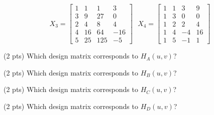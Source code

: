 \documentclass[twoside,12pt]{article}
\begin{document}
\begin{probset}
\begin{prob}
$$$$ 
$$
    X_3 = \begin{bmatrix}
    1 & 1 & 1 & 3 \\
    3 & 9 & 27 & 0 \\
    2 & 4 & 8 & 4 \\
    4 & 16 & 64 & -16 \\
    5 & 25 & 125 & -5
    \end{bmatrix} \ \ \ 
    X_4 = \begin{bmatrix}
    1 & 1 & 3  & 9 \\
    1 & 3 & 0  & 0 \\
    1 & 2 & 2  & 4 \\
    1 & 4 & -4 & 16 \\
    1 & 5 & -1 & 1
    \end{bmatrix}
$$
    

\begin{subprobset}
    \begin{subprob}(2 pts)
        Which design matrix corresponds to $H_A(u, v)$?

        \begin{center}
        \end{center}
    \end{subprob}

    \begin{subprob}(2 pts)
        Which design matrix corresponds to $H_B(u, v)$?

        \begin{center}
        \end{center}
    \end{subprob}

    \begin{subprob}(2 pts)
        Which design matrix corresponds to $H_C(u, v)$?

        \begin{center}
        \end{center}
    \end{subprob}

    \begin{subprob}(2 pts)
        Which design matrix corresponds to $H_D(u, v)$?


\end{subprob}
\end{subprobset}
\end{prob}
\end{probset}
\end{document}

